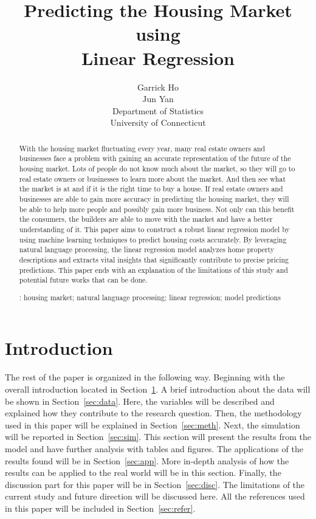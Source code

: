 \documentclass[12pt]{article}
\title{Predicting the Housing Market using \\ Linear Regression}
\author{Garrick Ho\\
  Jun Yan\\[1ex]
  Department of Statistics\\
  University of Connecticut\\
}
\begin{document}
\maketitle
\doublespace

\begin{abstract}
With the housing market fluctuating every year, many real estate owners and businesses face a problem with gaining an accurate representation of the future of the housing market. Lots of people do not know much about the market, so they will go to real estate owners or businesses to learn more about the market. And then see what the market is at and if it is the right time to buy a house. If real estate owners and businesses are able to gain more accuracy in predicting the housing market, they will be able to help more people and possibly gain more business. Not only can this benefit the consumers, the builders are able to move with the market and have a better understanding of it. This paper aims to construct a robust linear regression model by using machine learning techniques to predict housing costs accurately. By leveraging natural language processing, the linear regression model analyzes home property descriptions and extracts vital insights that significantly contribute to precise pricing predictions. This paper ends with an explanation of the limitations of this study and potential future works that can be done.

\bigskip
{}:
housing market;
natural language processing;
linear regression;
model predictions


\end{abstract}

\section{Introduction}
\label{sec:intro}



The rest of the paper is organized in the following way.
Beginning with the overall introduction located in Section~\ref{sec:intro}.
A brief introduction about the data will be shown in Section~\ref{sec:data}. Here, the variables will be described and explained how they contribute to the research question.
Then, the methodology used in this paper will be explained in Section~\ref{sec:meth}.
Next, the simulation will be reported in Section~\ref{sec:sim}. This section will present the results from the model and have further analysis with tables and figures.
The applications of the results found will be in Section~\ref{sec:app}. More in-depth analysis of how the results can be applied to the real world will be in this section.
Finally, the discussion part for this paper will be in Section~\ref{sec:disc}. The limitations of the current study and future direction will be discussed here.
All the references used in this paper will be included in Section~\ref{sec:refer}.
\end{document}
